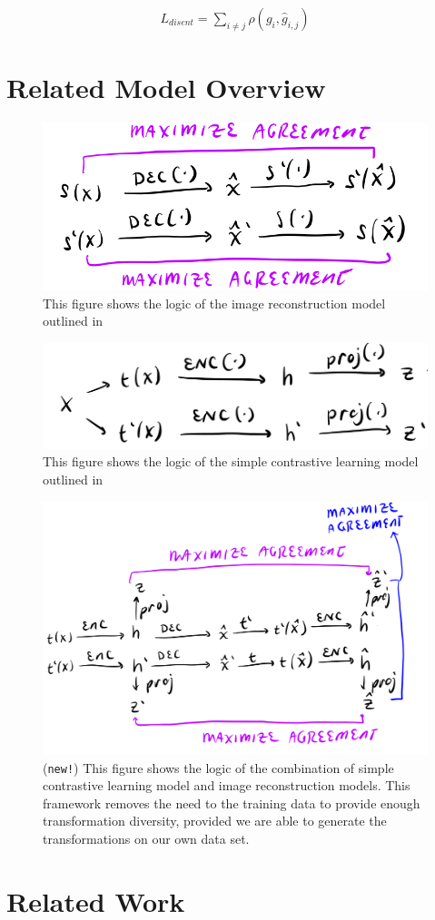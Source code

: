 \documentclass[11pt]{article}
\begin{document}
\begin{align}
  L_{disent} = \sum_{i \neq j} \rho(g_i,\hat{g}_{i,j})
\end{align}


\newpage
\section{Related Model Overview}

\begin{figure}[h]
  \centering
  \includegraphics[width=0.65\linewidth]{figs/imgrec_model}
  \caption{This figure shows the logic of the image reconstruction model outlined in~\cite{xia2019training}}
\end{figure}


\begin{figure}[h]
  \centering
  \includegraphics[width=0.65\linewidth]{figs/simclr_model}
  \caption{This figure shows the logic of the simple contrastive learning model outlined in~\cite{chen2020simple}}
\end{figure}

\begin{figure}[h]
  \centering
  \includegraphics[width=0.75\linewidth]{figs/imgrec_simclr_model}
  \caption{({\tt{new!}}) This figure shows the logic of the combination of simple contrastive learning model and image reconstruction models. This framework removes the need to the training data to provide enough transformation diversity, provided we are able to generate the transformations on our own data set.}
\end{figure}


\newpage
\section*{Related Work}


\newpage



\end{document}
